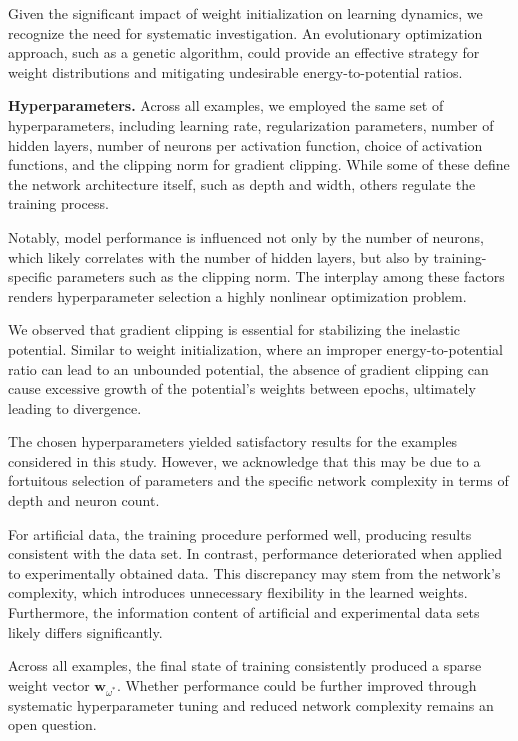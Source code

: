Given the significant impact of weight initialization on learning dynamics, we recognize the need for systematic investigation. 
An evolutionary optimization approach, such as a genetic algorithm, could provide an effective strategy for weight distributions and mitigating undesirable energy-to-potential ratios.\newline

\textbf{Hyperparameters.} Across all examples, we employed the same set of hyperparameters, including learning rate, regularization parameters, number of hidden layers, number of neurons per activation function, choice of activation functions, and the clipping norm for gradient clipping. 
While some of these define the network architecture itself, such as depth and width, others regulate the training process.

Notably, model performance is influenced not only by the number of neurons, which likely correlates with the number of hidden layers, but also by training-specific parameters such as the clipping norm. 
The interplay among these factors renders hyperparameter selection a highly nonlinear optimization problem.

We observed that gradient clipping is essential for stabilizing the inelastic potential. 
Similar to weight initialization, where an improper energy-to-potential ratio can lead to an unbounded potential, the absence of gradient clipping can cause excessive growth of the potential’s weights between epochs, ultimately leading to divergence.

The chosen hyperparameters yielded satisfactory results for the examples considered in this study. 
However, we acknowledge that this may be due to a fortuitous selection of parameters and the specific network complexity in terms of depth and neuron count.

For artificial data, the training procedure performed well, producing results consistent with the data set. 
In contrast, performance deteriorated when applied to experimentally obtained data. 
This discrepancy may stem from the network's complexity, which introduces unnecessary flexibility in the learned weights. 
Furthermore, the information content of artificial and experimental data sets likely differs significantly.

Across all examples, the final state of training consistently produced a sparse weight vector \( \mathbf{w}_{\omega^*} \). 
Whether performance could be further improved through systematic hyperparameter tuning and reduced network complexity remains an open question.

